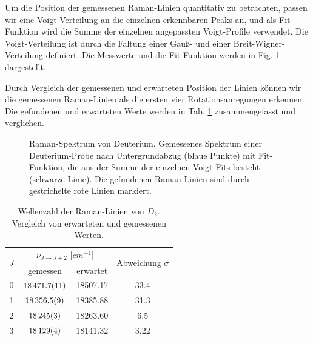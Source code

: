 \documentclass[11pt]{article}
\begin{document}
Um die Position der gemessenen Raman-Linien quantitativ zu betrachten, passen wir eine Voigt-Verteilung an die einzelnen erkennbaren Peaks an, und als Fit-Funktion wird die Summe der einzelnen angepassten Voigt-Profile verwendet. Die Voigt-Verteilung ist durch die Faltung einer Gauß- und einer Breit-Wigner-Verteilung definiert. Die Messwerte und die Fit-Funktion werden in Fig. \ref{fig:Deuterium} dargestellt.

Durch Vergleich der gemessenen und erwarteten Position der Linien können wir die gemessenen Raman-Linien als die ersten vier Rotationsanregungen erkennen. Die gefundenen und erwarteten Werte werden in Tab. \ref{tab:D2} zusammengefasst und verglichen.

\begin{figure}[htbp]
	\centering
   \caption{\small Raman-Spektrum von Deuterium. Gemessenes Spektrum einer Deuterium-Probe nach Untergrundabzug (blaue Punkte) mit Fit-Funktion, die aus der Summe der einzelnen Voigt-Fits besteht (schwarze Linie). Die gefundenen Raman-Linien sind durch gestrichelte rote Linien markiert.}
   \label{fig:Deuterium}
\end{figure}

\begin{table}[!htbp]
 \begin{center}
  \caption{\small Wellenzahl der Raman-Linien von $D_2$. Vergleich von erwarteten und gemessenen Werten.}
   \renewcommand{\arraystretch}{1.3} %
  \label{tab:D2}
  \begin{tabular}{|c|c|c|c|}
  \hline
\multirow{2}{*}{$J$}& \multicolumn{2}{c|}{$\bar{\nu}_{J\to J+2}$ [$\unit{cm^{-1}}$]} &  \multirow{2}{*}{ Abweichung $\sigma$} \\ \cline{2-3} %
 					 & gemessen & erwartet &    			\\ 
  \hline
	\hline 
0 & $\num{18471.7\pm 1.1}$	& 18507.17	& 33.4 \\
1 & $\num{18356.5	\pm 0.9}$	& 18385.88	& 31.3 \\
2 & $\num{18245\pm 3}$	& 18263.60	& 6.5	 \\
3 & $\num{18129\pm 4}$	& 18141.32	& 3.22 \\
	\hline
  \end{tabular}
  \renewcommand{\arraystretch}{1} 

 \end{center}
\end{table}
\end{document}

